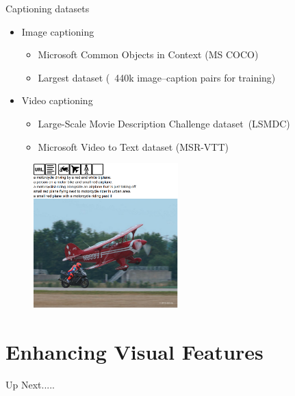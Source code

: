 \documentclass{beamer}
\begin{document}
\begin{frame}{Captioning datasets}
\begin{itemize}
    \item Image captioning
       \begin{itemize}
            \item Microsoft Common Objects in Context (MS COCO)
            \item Largest dataset (~440k image--caption pairs for training)
       \end{itemize}
       \item Video captioning
       \begin{itemize}
            \item Large-Scale Movie Description Challenge dataset~(LSMDC)
            \item Microsoft Video to Text dataset (MSR-VTT) 
       \end{itemize}
\end{itemize}\vspace{-3mm}
    \begin{figure}[h]
        \centering
        \includegraphics[width=0.5\textwidth]{images/Coco_sample.png}
        \vfill
    \end{figure}
\end{frame}
\section{Enhancing Visual Features}
\begin{frame}{Up Next.....}
\tableofcontents[currentsection] 
\end{frame}
\end{document}
